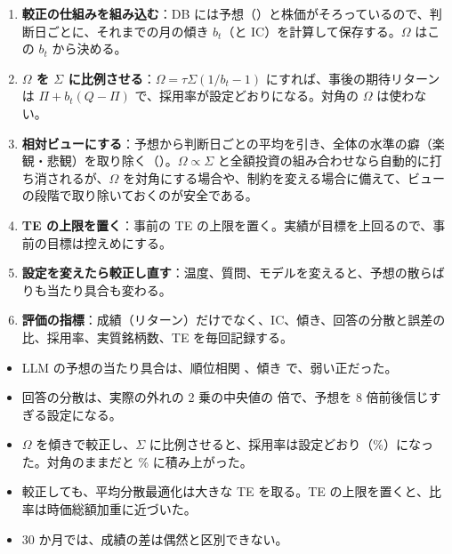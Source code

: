 \begin{enumerate}
\item \textbf{較正の仕組みを組み込む}：DB には予想（）と株価がそろっているので、判断日ごとに、それまでの月の傾き $b_t$（と IC）を計算して保存する。$\Omega$ はこの $b_t$ から決める。
\item \textbf{$\Omega$ を $\Sigma$ に比例させる}：$\Omega=\tau\Sigma(1/b_t-1)$ にすれば、事後の期待リターンは $\Pi+b_t(Q-\Pi)$ で、採用率が設定どおりになる。対角の $\Omega$ は使わない。
\item \textbf{相対ビューにする}：予想から判断日ごとの平均を引き、全体の水準の癖（楽観・悲観）を取り除く（）。$\Omega\propto\Sigma$ と全額投資の組み合わせなら自動的に打ち消されるが、$\Omega$ を対角にする場合や、制約を変える場合に備えて、ビューの段階で取り除いておくのが安全である。
\item \textbf{TE の上限を置く}：事前の TE の上限を置く。実績が目標を上回るので、事前の目標は控えめにする。
\item \textbf{設定を変えたら較正し直す}：温度、質問、モデルを変えると、予想の散らばりも当たり具合も変わる。
\item \textbf{評価の指標}：成績（リターン）だけでなく、IC、傾き、回答の分散と誤差の比、採用率、実質銘柄数、TE を毎回記録する。
\end{enumerate}

\begin{keybox}[この章のまとめ]
\begin{itemize}
\item LLM の予想の当たり具合は、順位相関 、傾き  で、弱い正だった。
\item 回答の分散は、実際の外れの 2 乗の中央値の  倍で、予想を 8 倍前後信じすぎる設定になる。
\item $\Omega$ を傾きで較正し、$\Sigma$ に比例させると、採用率は設定どおり（\%）になった。対角のままだと \% に積み上がった。
\item 較正しても、平均分散最適化は大きな TE を取る。TE の上限を置くと、比率は時価総額加重に近づいた。
\item 30 か月では、成績の差は偶然と区別できない。
\end{itemize}
\end{keybox}
